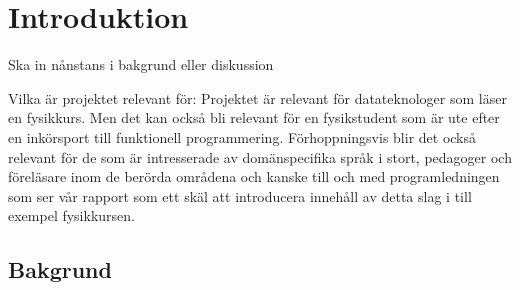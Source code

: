 
\chapter{Introduktion}

\begin{binge}

Ska in nånstans i bakgrund eller diskussion

Vilka är projektet relevant för:
Projektet är relevant för datateknologer som läser en fysikkurs. Men
det kan också bli relevant för en fysikstudent som är ute efter en
inkörsport till funktionell programmering. Förhoppningsvis blir det
också relevant för de som är intresserade av domänspecifika språk i
stort, pedagoger och föreläsare inom de berörda områdena och kanske
till och med programledningen som ser vår rapport som ett skäl att
introducera innehåll av detta slag i till exempel fysikkursen.

\end{binge}

\section{Bakgrund}

